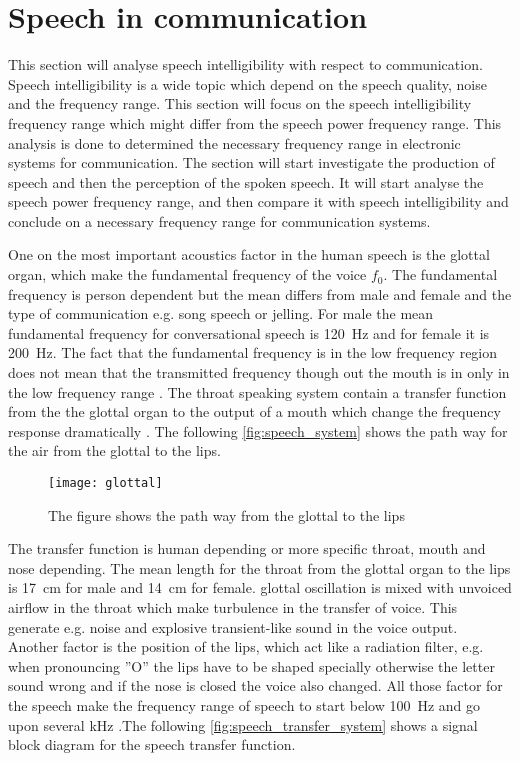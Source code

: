 \section{Speech in communication}
\label{speech_in_comm}
This section will analyse speech intelligibility with respect to communication. Speech intelligibility is a wide topic which depend on the speech quality, noise and the frequency range. This section will focus on the speech intelligibility frequency range which might differ from the speech power frequency range. This analysis is done to determined the necessary frequency range in electronic systems for communication. The section will start investigate the production of speech and then the perception of the spoken speech. It will start analyse the speech power frequency range, and then compare it with speech intelligibility and conclude on a necessary frequency range for communication systems.

One on the most important acoustics factor in the human speech is the glottal organ, which make the fundamental frequency of the voice $f_0$. The fundamental frequency is person dependent but the mean differs from male and female and the type of communication e.g. song speech or jelling. For male the mean fundamental frequency for conversational speech is \SI{120}{\hertz} and for female it is \SI{200}{\hertz}. The fact that the fundamental frequency is in the low frequency region does not mean that the transmitted frequency though out the mouth is in only in the low frequency range . The throat speaking system contain a transfer function from the the glottal organ to the output of a mouth  which change the frequency response dramatically \citep{pulkki2015}. The following \autoref{fig:speech_system} shows the path way for the air from the glottal to the lips.

 \begin{figure}[H]
	\centering
		\texttt{[image: glottal]}
		\caption{The figure shows the path way from the glottal to the lips \citep{pulkki2015}}
		\label{fig:speech_system}
\end{figure}

The transfer function is human depending or more specific throat, mouth and nose depending. The mean length for the throat from the glottal organ to the lips is \SI{17}{\centi\meter} for male and \SI{14}{\centi\meter} for female. glottal oscillation is mixed with unvoiced airflow in the throat which make turbulence in the transfer of voice. This generate e.g. noise and explosive transient-like sound in the voice output. Another factor is the position of the lips, which act like a radiation filter, e.g. when pronouncing ''O'' the lips have to be shaped specially otherwise the letter sound wrong and if the nose is closed the voice also changed. All those factor for the speech make the frequency range of speech to start below \SI{100}{\hertz} and go upon several \si{\kilo\hertz} \citep{pulkki2015}.The following \autoref{fig:speech_transfer_system} shows a signal block diagram for the speech transfer function.

